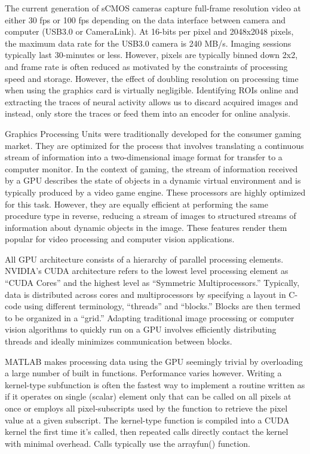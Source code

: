 \documentclass[
  12pt,
  lettersizepaper,
]{book}
\begin{document}
The current generation of sCMOS cameras capture full-frame resolution
video at either 30 fps or 100 fps depending on the data interface
between camera and computer (USB3.0 or CameraLink). At 16-bits per pixel
and 2048x2048 pixels, the maximum data rate for the USB3.0 camera is 240
MB/s. Imaging sessions typically last 30-minutes or less. However,
pixels are typically binned down 2x2, and frame rate is often reduced as
motivated by the constraints of processing speed and storage. However,
the effect of doubling resolution on processing time when using the
graphics card is virtually negligible. Identifying ROIs online and
extracting the traces of neural activity allows us to discard acquired
images and instead, only store the traces or feed them into an encoder
for online analysis.

Graphics Processing Units were traditionally developed for the consumer
gaming market. They are optimized for the process that involves
translating a continuous stream of information into a two-dimensional
image format for transfer to a computer monitor. In the context of
gaming, the stream of information received by a GPU describes the state
of objects in a dynamic virtual environment and is typically produced by
a video game engine. These processors are highly optimized for this
task. However, they are equally efficient at performing the same
procedure type in reverse, reducing a stream of images to structured
streams of information about dynamic objects in the image. These
features render them popular for video processing and computer vision
applications.

All GPU architecture consists of a hierarchy of parallel processing
elements. NVIDIA's CUDA architecture refers to the lowest level
processing element as ``CUDA Cores'' and the highest level as
``Symmetric Multiprocessors.'' Typically, data is distributed across
cores and multiprocessors by specifying a layout in C-code using
different terminology, ``threads'' and ``blocks.'' Blocks are then
termed to be organized in a ``grid.'' Adapting traditional image
processing or computer vision algorithms to quickly run on a GPU
involves efficiently distributing threads and ideally minimizes
communication between blocks.

MATLAB makes processing data using the GPU seemingly trivial by
overloading a large number of built in functions. Performance varies
however. Writing a kernel-type subfunction is often the fastest way to
implement a routine written as if it operates on single (scalar) element
only that can be called on all pixels at once or employs all
pixel-subscripts used by the function to retrieve the pixel value at a
given subscript. The kernel-type function is compiled into a CUDA kernel
the first time it's called, then repeated calls directly contact the
kernel with minimal overhead. Calls typically use the arrayfun()
function.
\end{document}
